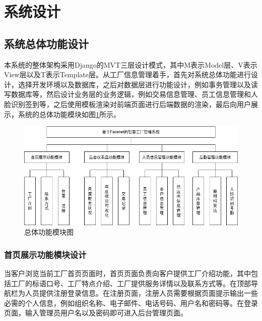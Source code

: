 \section{系统设计}

\subsection{系统总体功能设计}

本系统的整体架构采用Django的MVT三层设计模式，其中M表示Model层、V表示View层以及T表示Template层。从工厂信息管理着手，首先对系统总体功能进行设计，选择开发环境以及数据库，之后对数据层进行功能设计，例如事务管理以及读写数据库等，然后设计业务层的业务逻辑，例如交易信息管理、员工信息管理和人脸识别签到等，之后使用模板渲染对前端页面进行后端数据的渲染，最后向用户展示，系统的总体功能模块如图\ref{fig:funmod}所示。


\begin{figure}[H]
    \centering
    \includegraphics[width=\textwidth]{figures/4funmod.png}
    \caption{总体功能模块图}
    \label{fig:funmod}
\end{figure}

\subsubsection{首页展示功能模块设计}

当客户浏览当前工厂首页页面时，首页页面负责向客户提供工厂介绍功能，其中包括工厂的标语口号、工厂特点介绍、工厂提供服务详情以及联系方式等。在顶部导航栏为人员提供注册登录信息。在注册页面，注册人员需要根据页面提示输出一些必需的个人信息，例如组织名称、电子邮件、电话号码、用户名和密码等。在登录页面，输入管理员用户名以及密码即可进入后台管理页面。

